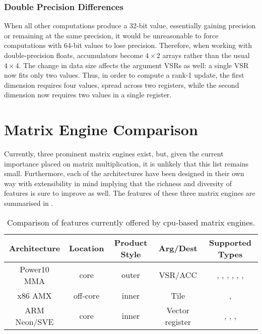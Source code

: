 \documentclass[\main/thesis.tex]{subfiles}
\begin{document}
\subsubsection{Double Precision Differences}
\label{sec:doubles}
When all other computations produce a 32-bit value, essentially gaining precision or remaining at the same precision, it would be unreasonable to force computations with 64-bit values to lose precision.
Therefore, when working with double-precision floats, accumulators become $4 \times 2$ arrays rather than the usual $4 \times 4$.
The change in data size affects the argument VSRs as well: a single VSR now fits only two values.
Thus, in order to compute a rank-1 update, the first dimension requires four values, spread across two registers, while the second dimension now requires two values in a single register.

\section{Matrix Engine Comparison}
\label{sec:matrixEngines}
Currently, three prominent matrix engines exist, but, given the current importance placed on matrix multiplication, it is unlikely that this list remains small.
Furthermore, each of the architectures have been designed in their own way with extensibility in mind implying that the richness and diversity of features is sure to improve as well.
The features of these three matrix engines are summarised in .

\begin{table}
  \centering
  \begin{tabular}{| c | c | c | c | c |}
    \hline
    Architecture & Location & \parbox[t][28pt][t]{40pt}{\centering Product Style} & Arg/Dest & Supported Types\\\hline
    \parbox[t][][t]{40pt}{\centering Power10 MMA} & core & outer & VSR/ACC & \parbox[t][40pt][t]{3.2cm}{\raggedright{}, , , , , , }\\\hline
    x86 AMX & off-core & inner & Tile &\parbox[t][11pt][t]{3.3cm}{\raggedright{}, }\\\hline
    \parbox[t][][t]{60pt}{\centering ARM Neon/SVE} & core & inner & Vector register & \parbox[t][25pt][t]{3.3cm}{\raggedright{}, , , }\\\hline
  \end{tabular}
  \caption[Matrix Engine Feature Comparison]{Comparison of features currently offered by cpu-based matrix engines.}
  \label{tab:featComp}
\end{table}
\end{document}
